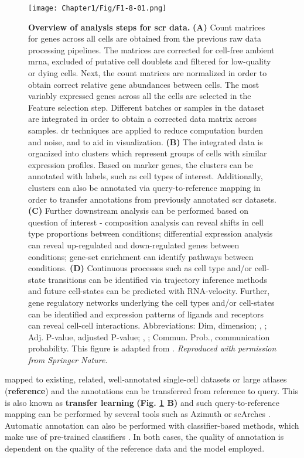 \begin{figure}[H]
    \centering
    \texttt{[image: Chapter1/Fig/F1-8-01.png]}
    \caption[Workflow for preprocessing and analysis of  data]
    {\textbf{Overview of analysis steps for \gls{scr} data.} \textbf{(A)} Count matrices for genes across all cells are obtained from the previous raw data processing pipelines. The matrices are corrected for cell-free ambient \gls{mrna}, excluded of putative cell doublets and filtered for low-quality or dying cells. Next, the count matrices are normalized in order to obtain correct relative gene abundances between cells. The most variably expressed genes across all the cells are selected in the Feature selection step. Different batches or samples in the dataset are integrated in order to obtain a corrected data matrix across samples. \gls{dr} techniques are applied to reduce computation burden and noise, and to aid in visualization. \textbf{(B)} The integrated data is organized into clusters which represent groups of cells with similar expression profiles. Based on marker genes, the clusters can be annotated with labels, such as cell types of interest. Additionally, clusters can also be annotated via query-to-reference mapping in order to transfer annotations from previously annotated \gls{scr} datasets. \textbf{(C)} Further downstream analysis can be performed based on question of interest - composition analysis can reveal shifts in cell type proportions between conditions; differential expression analysis can reveal up-regulated and down-regulated genes between conditions; gene-set enrichment can identify pathways between conditions. \textbf{(D)} Continuous processes such as cell type and/or cell-state transitions can be identified via trajectory inference methods and future cell-states can be predicted with RNA-velocity. Further, gene regulatory networks underlying the cell types and/or cell-states can be identified and expression patterns of ligands and receptors can reveal cell-cell interactions. Abbreviations: Dim, dimension; , ; Adj. P-value, adjusted P-value; , ; Commun. Prob., communication probability. This figure is adapted from \textbf{\cite{heumos_best_2023,weiler_guide_2022,armingol_deciphering_2021}}.\textit{ Reproduced with permission from Springer Nature.}}
    \label{fig:chp1_scrna-workflow}
\end{figure}

 mapped to existing, related, well-annotated single-cell datasets or large atlases (\textbf{reference}) and the annotations can be transferred from reference to query. This is also known as \textbf{transfer learning} \textbf{(Fig. \ref{fig:chp1_scrna-workflow} B)} and such query-to-reference mapping can be performed by several tools such as Azimuth \textbf{\cite{hao_integrated_2021}} or scArches \textbf{\cite{lotfollahi_mapping_2021}}. Automatic annotation can also be performed with classifier-based methods, which make use of pre-trained classifiers \textbf{\cite{dominguez_conde_cross-tissue_2022,fu_clustifyr_2020}}. In both cases, the quality of annotation is dependent on the quality of the reference data and the model employed.\\

